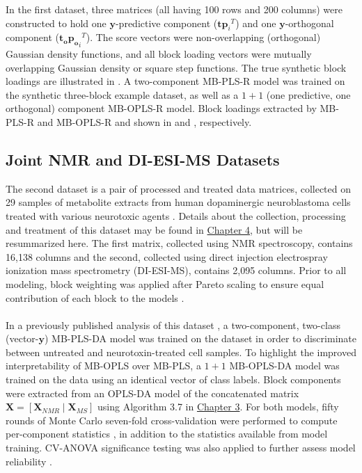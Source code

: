 \begin{doublespace}
In the first dataset, three matrices (all having 100 rows and 200 columns)
were constructed to hold one $\mathbf{y}$-predictive component
($\mathbf{t} {\mathbf{p}_i}^T$) and one $\mathbf{y}$-orthogonal component
($\mathbf{t_o} {\mathbf{p_o}_i}^T$). The score vectors were non-overlapping
(orthogonal) Gaussian density functions, and all block loading vectors were
mutually overlapping Gaussian density or square step functions. The true
synthetic block loadings are illustrated in .
A two-component MB-PLS-R model was trained on the synthetic three-block
example dataset, as well as a $1+1$ (one predictive, one orthogonal)
component MB-OPLS-R model. Block loadings extracted by MB-PLS-R and
MB-OPLS-R and shown in  and
, respectively.
\end{doublespace}

\subsection{Joint \hnmr{} NMR and DI-ESI-MS Datasets}

\begin{doublespace}
The second dataset is a pair of processed and treated data matrices, collected
on 29 samples of metabolite extracts from human dopaminergic neuroblastoma
cells treated with various neurotoxic agents \cite{lei:acscb2014}. Details
about the collection, processing and treatment of this dataset may be found
in \hyperlink{section.4.3}{Chapter 4}, but will be resummarized here. The
first matrix, collected using \hnmr{} NMR spectroscopy, contains 16,138
columns and the second, collected using direct injection electrospray
ionization mass spectrometry (DI-ESI-MS), contains 2,095 columns. Prior
to all modeling, block weighting was applied after Pareto scaling to ensure
equal contribution of each block to the models \cite{smilde:jchemo2003}.
\\\\
In a previously published analysis of this dataset \cite{marshall:metab2015},
a two-component, two-class (vector-$\mathbf{y}$) MB-PLS-DA model was trained
on the dataset in order to discriminate between untreated and
neurotoxin-treated cell samples. To highlight the improved interpretability
of MB-OPLS over MB-PLS, a $1+1$ MB-OPLS-DA model was trained on the data
using an identical vector of class labels. Block components were extracted
from an OPLS-DA model of the concatenated matrix
$\mathbf{X}=[\mathbf{X}_{NMR}\mid\mathbf{X}_{MS}]$ using Algorithm 3.7 in
\hyperlink{subsection.3.5.6}{Chapter 3}. For both models, fifty rounds of
Monte Carlo seven-fold cross-validation \cite{shao:jasa1993,xu:cils2001}
were performed to compute per-component \qsq{} statistics
\cite{wold:cils2001}, in addition to the \rsq{} statistics available
from model training. CV-ANOVA significance testing was also applied
to further assess model reliability \cite{eriksson:jchemo2008}.
\end{doublespace}

